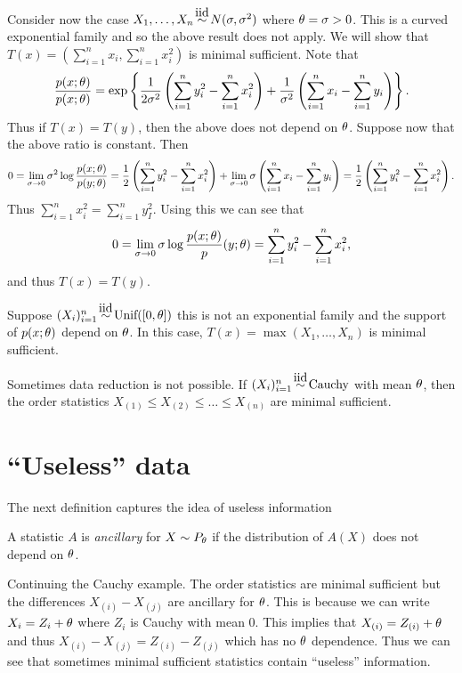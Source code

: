 \begin{ex}
        Consider now the case $X_1,\ldots, X_n \iid N(\sigma, \sigma^2)$ where ${\theta} = \sigma > 0$. This is a curved exponential family and so the above result does not apply. We will show that $T(x) = \left(\sum_{i=1}^n x_i, \sum_{i=1}^n x_i^2\right)$ is minimal sufficient. Note that 
        \[\frac{p(x;{\theta})}{p(x;{\theta})} = \exp\left\{\frac{1}{2\sigma^2}\left(\sum_{i=1}^n y_i^2 - \sum_{i=1}^n x_i^2\right)+\frac{1}{\sigma^2}\left(\sum_{i=1}^n x_i - \sum_{i=1}^n y_i\right)\right\}. \]
        Thus if $T(x) = T(y)$, then the above does not depend on ${\theta}$. Suppose now that the above ratio is constant. Then 
        \[ 0=\lim_{\sigma \to 0}\sigma^2 \log\frac{p(x;{\theta})}{p(y;{\theta})} = \frac{1}{2}\left( \sum_{i=1}^n y_i^2-\sum_{i=1}^n x_i^2\right)+\lim_{\sigma \to 0} \sigma\left(\sum_{i=1}^n x_i -\sum_{i=1}^n y_i\right) = \frac{1}{2}\left( \sum_{i=1}^n y_i^2-\sum_{i=1}^n x_i^2\right). \]
        Thus $\sum_{i=1}^n x_i^2 = \sum_{i=1}^n y_I^2$. Using this we can see that 
        \[0 =\lim_{\sigma \to 0} \sigma \log{\frac{p(x;{\theta})}p(y;{\theta})} =  \sum_{i=1}^n y_i^2-\sum_{i=1}^n x_i^2,\]
        and thus $T(x) = T(y)$. 
\end{ex}
\begin{ex}
    Suppose $(X_i)_{i=1}^n \iid \text{Unif}([0,\ta])$ this is not an exponential family and the support of $p(x;{\theta})$ depend on ${\theta}$. In this case, $T(x) = \max(X_1,\ldots, X_n)$ is minimal sufficient.
\end{ex}
\begin{ex}
    Sometimes data reduction is not possible. If $(X_i)_{i=1}^n \iid \text{Cauchy}$ with mean ${\theta}$, then the order statistics $X_{(1)} \le X_{(2)} \le \ldots \le X_{(n)}$ are minimal sufficient.
\end{ex}

\section{``Useless'' data}
The next definition captures the idea of useless information

\begin{defn}
    A statistic $A$ is \emph{ancillary} for $X \sim P_{\theta}$ if the distribution of $A(X)$ does not depend on ${\theta}$.
\end{defn}
\begin{ex}
    Continuing the Cauchy example. The order statistics are minimal sufficient but the differences $X_{(i)} - X_{(j)}$ are ancillary for ${\theta}$. This is because we can write $X_i = Z_i +{\theta}$ where $Z_i$ is Cauchy with mean 0. This implies that $X_{(i)} = Z_{(i)}+{\theta}$ and thus $X_{(i)}-X_{(j)} = Z_{(i)}-Z_{(j)}$ which has no ${\theta}$ dependence. Thus we can see that sometimes minimal sufficient statistics contain ``useless'' information.
\end{ex}

